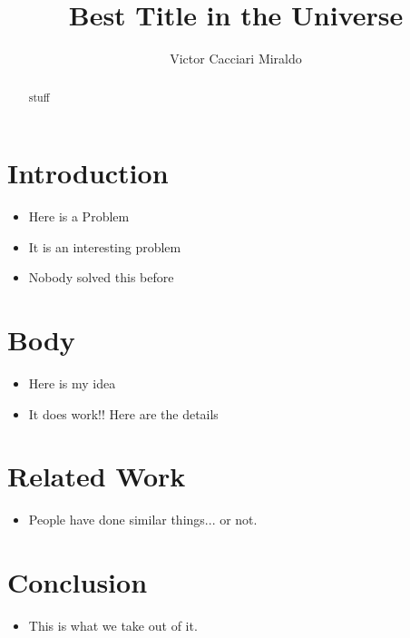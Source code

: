 \documentclass{llncs}
\title{Best Title in the Universe}
\author{Victor Cacciari Miraldo}
\begin{document}
\maketitle

\begin{abstract}
stuff
\end{abstract}

\section{Introduction}
  \begin{itemize}
    \item Here is a Problem
    \item It is an interesting problem
    \item Nobody solved this before
  \end{itemize}

\section{Body}
  \begin{itemize}
    \item Here is my idea
    \item It does work!! Here are the details
  \end{itemize}
  
\section{Related Work}
  \begin{itemize}
    \item People have done similar things... or not.
  \end{itemize}
  
\section{Conclusion}
  \begin{itemize}
    \item This is what we take out of it.
  \end{itemize}
\end{document}
